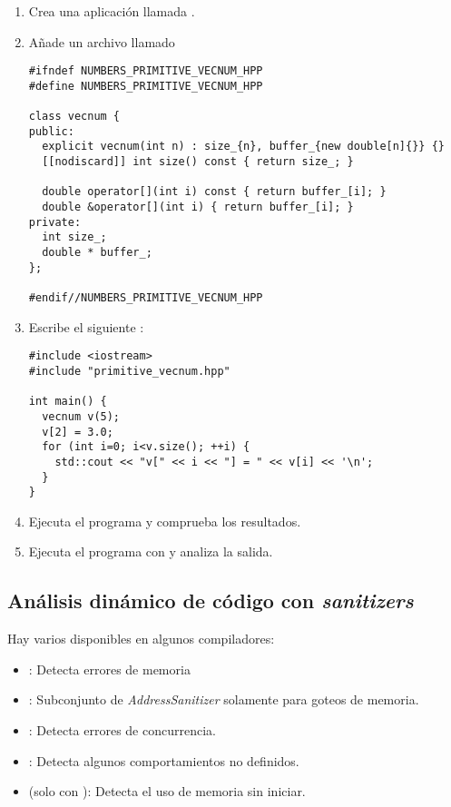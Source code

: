 \begin{enumerate}

\item
Crea una aplicación llamada .

\item Añade un archivo llamado 

\begin{lstlisting}
#ifndef NUMBERS_PRIMITIVE_VECNUM_HPP
#define NUMBERS_PRIMITIVE_VECNUM_HPP

class vecnum {
public:
  explicit vecnum(int n) : size_{n}, buffer_{new double[n]{}} {}
  [[nodiscard]] int size() const { return size_; }

  double operator[](int i) const { return buffer_[i]; }
  double &operator[](int i) { return buffer_[i]; }
private:
  int size_;
  double * buffer_;
};

#endif//NUMBERS_PRIMITIVE_VECNUM_HPP
\end{lstlisting}

\item
Escribe el siguiente :

\begin{lstlisting}
#include <iostream>
#include "primitive_vecnum.hpp"

int main() {
  vecnum v(5);
  v[2] = 3.0;
  for (int i=0; i<v.size(); ++i) {
    std::cout << "v[" << i << "] = " << v[i] << '\n';
  }
}
\end{lstlisting}

\item
Ejecuta el programa y comprueba los resultados.

\item
Ejecuta el programa con  y analiza la salida.

\end{enumerate}

\subsection{Análisis dinámico de código con \emph{sanitizers}}

Hay varios  disponibles en algunos compiladores:

\begin{itemize}
  \item {}: 
        Detecta errores de memoria
  \item {}: 
        Subconjunto de \emph{AddressSanitizer} solamente para goteos de memoria.
  \item {}: 
        Detecta errores de concurrencia.
  \item {}: 
        Detecta algunos comportamientos no definidos.
  \item {} (solo con ): 
        Detecta el uso de memoria sin iniciar.
\end{itemize}

